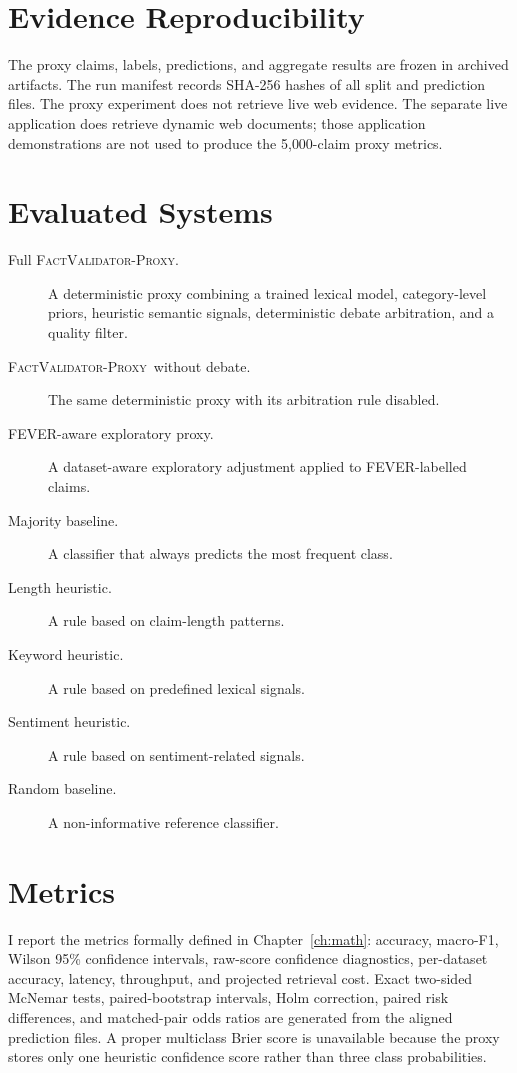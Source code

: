 \documentclass[12pt,a4paper,openany]{report}
\newcommand{\proxy}{\textsc{FactValidator-Proxy}}
\begin{document}
\section{Evidence Reproducibility}
The proxy claims, labels, predictions, and aggregate results are frozen in archived artifacts. The run manifest records SHA-256 hashes of all split and prediction files. The proxy experiment does not retrieve live web evidence. The separate live application does retrieve dynamic web documents; those application demonstrations are not used to produce the 5{,}000-claim proxy metrics.

\section{Evaluated Systems}
\begin{description}
  \item[Full \proxy.] A deterministic proxy combining a trained lexical model, category-level priors, heuristic semantic signals, deterministic debate arbitration, and a quality filter.
  \item[\proxy\ without debate.] The same deterministic proxy with its arbitration rule disabled.
  \item[FEVER-aware exploratory proxy.] A dataset-aware exploratory adjustment applied to FEVER-labelled claims.
  \item[Majority baseline.] A classifier that always predicts the most frequent class.
  \item[Length heuristic.] A rule based on claim-length patterns.
  \item[Keyword heuristic.] A rule based on predefined lexical signals.
  \item[Sentiment heuristic.] A rule based on sentiment-related signals.
  \item[Random baseline.] A non-informative reference classifier.
\end{description}

\section{Metrics}
I report the metrics formally defined in Chapter~\ref{ch:math}: accuracy, macro-F1, Wilson 95\% confidence intervals, raw-score confidence diagnostics, per-dataset accuracy, latency, throughput, and projected retrieval cost. Exact two-sided McNemar tests, paired-bootstrap intervals, Holm correction, paired risk differences, and matched-pair odds ratios are generated from the aligned prediction files. A proper multiclass Brier score is unavailable because the proxy stores only one heuristic confidence score rather than three class probabilities.
\end{document}
